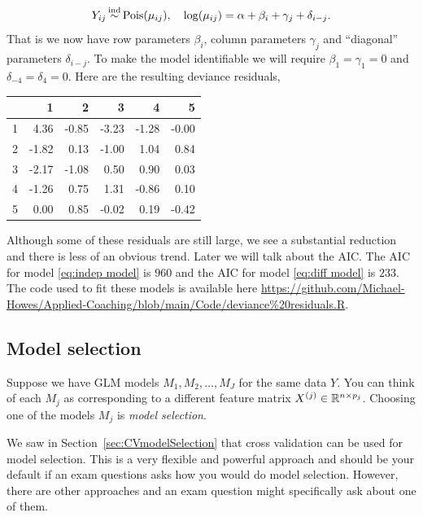 \begin{example}
        \begin{equation}Y_{ij} \simind \mathrm{Pois}(\mu_{ij}), \quad \log(\mu_{ij}) = \alpha + \beta_i + \gamma_j + \delta_{i-j}.  \label{eq:diff model}\end{equation}
        That is we now have row parameters $\beta_i$, column parameters $\gamma_j$ and ``diagonal'' parameters $\delta_{i-j}$. To make the model identifiable we  will require $\beta_1 =\gamma_1 = 0$ and $\delta_{-4}=\delta_{4}= 0$. Here are the resulting deviance residuals,
        \begin{table}[ht]
            \centering
            \begin{tabular}{|r|rrrrr|}
              \hline
             & 1 & 2 & 3 & 4 & 5 \\ 
              \hline
            1 & 4.36 & -0.85 & -3.23 & -1.28 & -0.00 \\ 
              2 & -1.82 & 0.13 & -1.00 & 1.04 & 0.84 \\ 
              3 & -2.17 & -1.08 & 0.50 & 0.90 & 0.03 \\ 
              4 & -1.26 & 0.75 & 1.31 & -0.86 & 0.10 \\ 
              5 & 0.00 & 0.85 & -0.02 & 0.19 & -0.42 \\ 
               \hline
            \end{tabular}
            \end{table}
        Although some of these residuals are still large, we see a substantial reduction and there is less of an obvious trend. Later we will talk about the AIC. The AIC for model \eqref{eq:indep model} is $960$ and the AIC for model \eqref{eq:diff model} is $233$. The code used to fit these models is available here \url{https://github.com/Michael-Howes/Applied-Coaching/blob/main/Code/deviance%20residuals.R}.
\end{example}

\subsection{Model selection}

Suppose we have GLM models $M_1,M_2,\ldots,M_J$ for the same data $Y$. You can think of each $M_j$ as corresponding to a different feature matrix $X^{(j)} \in \mathbb{R}^{n \times p_j}$. Choosing one of the models $M_j$ is \emph{model selection}. 


We saw in Section~\ref{sec:CVmodelSelection} that cross validation can be used for model selection. This is a very flexible and powerful approach and should be your default if an exam questions asks how you would do model selection. However, there are other approaches and an exam question might specifically ask about one of them.



